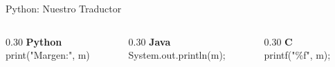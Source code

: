 \documentclass[aspectratio=169, 11pt]{beamer}
\begin{document}
\begin{frame}{Python: Nuestro Traductor}
  \vspace{6pt}
  \begin{columns}[c]
    \begin{column}{0.30\textwidth}
      \centering
      {\small\bfseries\color{arcaRed} Python}\\[4pt]
      {\footnotesize\ttfamily print("Margen:", m)}
    \end{column}
    \begin{column}{0.30\textwidth}
      \centering
      {\small\bfseries\color{textMuted} Java}\\[4pt]
      {\footnotesize\ttfamily System.out.println(m);}
    \end{column}
    \begin{column}{0.30\textwidth}
      \centering
      {\small\bfseries\color{textMuted} C}\\[4pt]
      {\footnotesize\ttfamily printf("\%f", m);}
    \end{column}
  \end{columns}
\end{frame}
\end{document}
